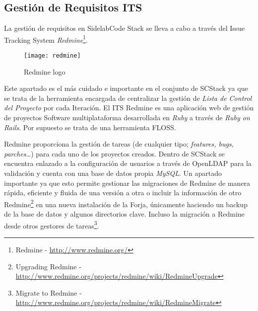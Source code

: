 


\subsection{Gestión de Requisitos ITS}
\label{sub:its}

\par La gestión de requisitos en SidelabCode Stack se lleva a cabo a través del Issue Tracking System \emph{Redmine}\footnote{Redmine - \url{http://www.redmine.org/}}.

\begin{figure}[H]
    \centering
    \texttt{[image: redmine]}
    \caption{Redmine logo}
    \label{fig:redmine-logo}
\end{figure}

\par Este apartado es el más cuidado e importante en el conjunto de SCStack ya que se trata de la herramienta encargada de centralizar la gestión de \emph{Lista de Control del Proyecto} por cada Iteración. El ITS Redmine es una aplicación web de gestión de proyectos Software multiplataforma desarrollada en \emph{Ruby} a través de \emph{Ruby on Rails}. Por supuesto se trata de una herramienta FLOSS.

\par Redmine proporciona la gestión de tareas (de cualquier tipo; \emph{features, bugs, parches\ldots}) para cada uno de los proyectos creados. Dentro de SCStack se encuentra enlazado a la configuración de usuarios a través de OpenLDAP para la validación y cuenta con una base de datos propia \emph{MySQL}. Un apartado importante ya que esto permite gestionar las migraciones de Redmine de manera rápida, eficiente y fluida de una versión a otra o incluir la información de otro Redmine\footnote{Upgrading Redmine - \url{http://www.redmine.org/projects/redmine/wiki/RedmineUpgrade}} en una nueva instalación de la Forja, únicamente haciendo un backup de la base de datos y algunos directorios clave. Incluso la migración a Redmine desde otros gestores de tareas\footnote{Migrate to Redmine - \url{http://www.redmine.org/projects/redmine/wiki/RedmineMigrate}}.

